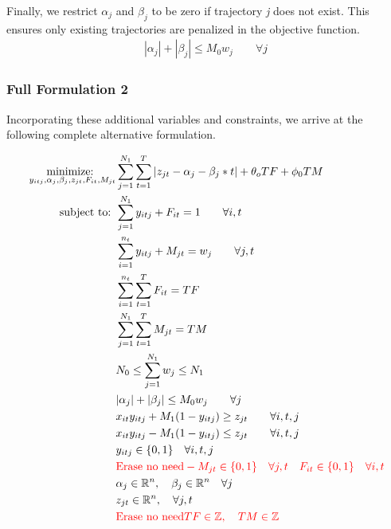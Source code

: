 \documentclass[journal]{IEEEtran}
\begin{document}
Finally, we restrict $\alpha_{j}$ and $\beta_{j}$ to be zero if trajectory \textit{j} does not exist. This ensures only existing trajectories are penalized in the objective function. 
\begin{align}
|\alpha_{j}|+|\beta_{j}| \leq M_{0}w_{j}\qquad \forall j\
\end{align}

\subsubsection{Full Formulation 2}

Incorporating these additional variables and constraints, we arrive at the following complete alternative formulation.

\begin{align*}
\underset{y_{itj}, \alpha_{j}, \beta_{j}, z_{jt},F_{it},M_{jt}}{\text{minimize: }} & \sum_{j=1}^{N_{1}} \sum_{t=1}^{T} |z_{jt} - \alpha_{j} - \beta_{j}*t| + \theta_{o} TF + \phi_{0} TM\\
\text{subject to: }	& \sum_{j=1}^{N_{1}} y_{itj} + F_{it} = 1 \qquad \forall i,t\\
				& \sum_{i=1}^{n_{t}} y_{itj} + M_{jt} = w_{j} \qquad \forall j,t\\
				& \sum_{i=1}^{n_{t}} \sum_{t=1}^{T} F_{it} = TF\\
				& \sum_{j=1}^{N_{1}} \sum_{t=1}^{T} M_{jt} = TM\\
				& N_{0} \leq \sum_{j=1}^{N_{1}} w_{j} \leq N_{1}\\
				& |\alpha_{j}|+|\beta_{j}| \leq M_{0}w_{j}\qquad \forall j\\
				& x_{it}y_{itj} + M_{1}(1-y_{itj}) \geq z_{jt} \qquad \forall i,t,j\\
				& x_{it}y_{itj} - M_{1}(1-y_{itj}) \leq z_{jt} \qquad \forall i,t,j\\
			 	& y_{itj} \in \{0,1\} \quad \forall i,t,j\\
				& {\color{red} \text{Erase no need} - M_{jt} \in \{0,1\} \quad \forall j,t \quad F_{it} \in \{0,1\} \quad \forall i,t}\\ 
				& \alpha_{j} \in \mathbb{R}^n,\quad \beta_{j} \in \mathbb{R}^n \quad \forall j\\
				& z_{jt} \in \mathbb{R}^n, \quad \forall j,t\\
				& {\color{red} \text{Erase no need} TF \in \mathbb{Z}, \quad TM \in \mathbb{Z}}\\
\end{align*}
\end{document}
